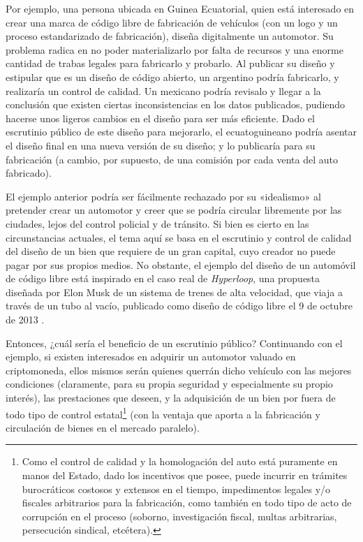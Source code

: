 \documentclass[12pt,a4paper]{article}
\begin{document}
Por ejemplo, una persona ubicada en Guinea Ecuatorial, quien está interesado en crear una marca de código libre de fabricación de vehículos (con un logo y un proceso estandarizado de fabricación), diseña digitalmente un automotor. Su problema radica en no poder materializarlo por falta de recursos y una enorme cantidad de trabas legales para fabricarlo y probarlo. Al publicar su diseño y estipular que es un diseño de código abierto, un argentino podría fabricarlo, y realizaría un control de calidad. Un mexicano podría revisalo y llegar a la conclusión que existen ciertas inconsistencias en los datos publicados, pudiendo hacerse unos ligeros cambios en el diseño para ser más eficiente. Dado el escrutinio público de este diseño para mejorarlo, el ecuatoguineano podría asentar el diseño final en una nueva versión de su diseño; y lo publicaría para su fabricación (a cambio, por supuesto, de una comisión por cada venta del auto fabricado).

El ejemplo anterior podría ser fácilmente rechazado por su «idealismo» al pretender crear un automotor y creer que se podría circular libremente por las ciudades, lejos del control policial y de tránsito. Si bien es cierto en las circunstancias actuales, el tema aquí se basa en el escrutinio y control de calidad del diseño de un bien que requiere de un gran capital, cuyo creador no puede pagar por sus propios medios. No obstante, el ejemplo del diseño de un automóvil de código libre está inspirado en el caso real de \textit{Hyperloop}, una propuesta diseñada por Elon Musk de un sistema de trenes de alta velocidad, que viaja a través de un tubo al vacío, publicado como diseño de código libre el 9 de octubre de 2013 \cite{hyperloop}.

Entonces, ¿cuál sería el beneficio de un escrutinio público? Continuando con el ejemplo, si existen interesados en adquirir un automotor valuado en criptomoneda, ellos mismos serán quienes querrán dicho vehículo con las mejores condiciones (claramente, para su propia seguridad y especialmente su propio interés), las prestaciones que deseen, y la adquisición de un bien por fuera de todo tipo de control estatal\footnote{Como el control de calidad y la homologación del auto está puramente en manos del Estado, dado los incentivos que posee, puede incurrir en trámites burocráticos costosos y extensos en el tiempo, impedimentos legales y/o fiscales arbitrarios para la fabricación, como también en todo tipo de acto de corrupción en el proceso (soborno, investigación fiscal, multas arbitrarias, persecución sindical, etcétera).} (con la ventaja que aporta a la fabricación y circulación de bienes en el mercado paralelo).
\end{document}
